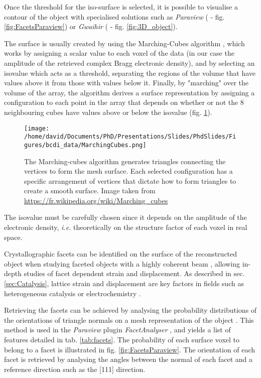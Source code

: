 Once the threshold for the iso-surface is selected, it is possible to visualise a contour of the object with specialised solutions such as \textit{Paraview} (\cite{Ahrens2001} - fig. \ref{fig:FacetsParaview}) or \textit{Gwaihir} (\cite{Simonne2022} - fig. \ref{fig:3D_object}).

The surface is usually created by using the Marching-Cubes algorithm \parencite{Lorensen1987}, which works by assigning a scalar value to each voxel of the data (in our case the amplitude of the retrieved complex Bragg electronic density), and by selecting an isovalue which acts as a threshold, separating the regions of the volume that have values above it from those with values below it.
Finally, by "marching" over the volume of the array, the algorithm derives a surface representation by assigning a configuration to each point in the array that depends on whether or not the 8 neighbouring cubes have values above or below the isovalue (fig. \ref{fig:MarchingCubes}).

\begin{figure}[!htb]
    \centering
    \texttt{[image: /home/david/Documents/PhD/Presentations/Slides/PhdSlides/Figures/bcdi\_data/MarchingCubes.png]}
    \caption{
    The Marching-cubes algorithm generates triangles connecting the vertices to form the mesh surface.
    Each selected configuration has a specific arrangement of vertices that dictate how to form triangles to create a smooth surface.
    Image taken from \url{https://fr.wikipedia.org/wiki/Marching_cubes}
    }
    \label{fig:MarchingCubes}
\end{figure}

The isovalue must be carefully chosen since it depends on the amplitude of the electronic density, \textit{i.e.} theoretically on the structure factor of each voxel in real space.

Crystallographic facets can be identified on the surface of the reconstructed object when studying faceted objects with a highly coherent beam \parencite{Richard2018}, allowing in-depth studies of facet dependent strain and displacement.
As described in sec. \ref{sec:Catalysis}, lattice strain and displacement are key factors in fields such as heterogeneous catalysis \parencite{Ulvestad2016, Kim2018, Fernandez2019, Abuin2019, Kim2019, Kawaguchi2019, Suzana2019, Choi2020, Passos2020,  Kim2021, Carnis2021, Dupraz2022} or electrochemistry \parencite{Ulvestad2015a, Bjorling2019, Vicente2021, Kawaguchi2021, Carnis2021b, Atlan2023}.

Retrieving the facets can be achieved by analysing the probability distributions of the orientations of triangle normals on a mesh representation of the object \parencite{Grothausmann2012}.
This method is used in the \textit{Paraview} plugin \textit{FacetAnalyser} \parencite{Grothausmann2015}, and yields a list of features detailed in tab. \ref{tab:facets}.
The probability of each surface voxel to belong to a facet is illustrated in fig. \ref{fig:FacetsParaview}.
The orientation of each facet is retrieved by analysing the angles between the normal of each facet and a reference direction such as the [111] direction.

